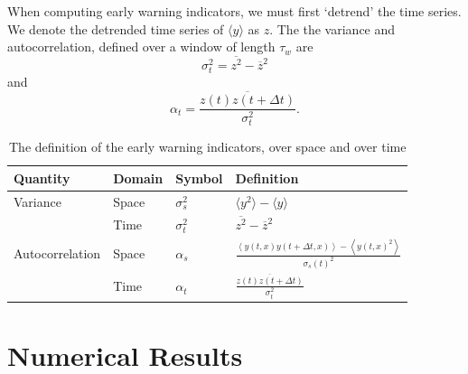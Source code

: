 When computing early warning indicators, we must first `detrend' the time series. We denote the detrended time series of $\langle y \rangle$ as $z$.
The the variance and autocorrelation, defined over a window of length $\tau_w$ are
\begin{equation}
  \label{eq:temporal_variance}
  \sigma_t^2 = \overline{z^2} - \overline{z}^2 
\end{equation}
and
\begin{equation}
  \label{eq:temporal_autocorrelation}
  \alpha_t = \frac{\overline{z(t)z(t+\Delta t)}}{\sigma_t^2}.
\end{equation}
\begin{table}
  \centering
  \begin{tabular}{llll}
    \toprule
    Quantity        & Domain & Symbol        & Definition \\
    \midrule
    Variance        & Space  & $\sigma_s^2$  & $\langle y^2 \rangle - \langle y \rangle$ \\
    \rule{0pt}{4ex}    
                    & Time   & $\sigma_t^2$  & $\overline{z^2} - \overline{z}^2$ \\
    \rule{0pt}{4ex}    
    Autocorrelation & Space  & $\alpha_s$    & $\frac{\left\langle y\left(t,x\right)y\left(t+\Delta t,x\right)\right\rangle - \left\langle y\left(t,x\right)^2 \right\rangle}{\sigma_s(t)^2}$ \\
    \rule{0pt}{4ex}    
                    & Time   & $\alpha_t$    &  $\frac{\overline{z(t)z(t+\Delta t)}}{\sigma_t^2}$ \\
    \bottomrule
  \end{tabular}
  \caption[Definition of spatial and temporal early warning signals]{The definition of the early warning indicators, over space and over time}
  \label{tab:ews_space_time_definition}
\end{table}

\section{Numerical Results}
